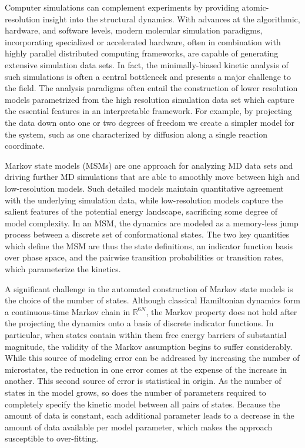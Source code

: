 \documentclass[twocolumn,floatfix,nofootinbib,aps]{revtex4-1}
\begin{document}
Computer simulations can complement experiments by providing atomic-resolution insight into the structural dynamics. With advances at the algorithmic, hardware, and software levels, modern molecular simulation paradigms, incorporating specialized or accelerated hardware, often in combination with highly parallel distributed computing frameworks, are capable of generating extensive simulation data sets\cite{Eastman2013OpenMM, Shirts2000Screen, Shaw2009Millisecond, Hess2008PLINCS}. In fact, the minimally-biased kinetic analysis of such simulations is often a central bottleneck and presents a major challenge to the field. The analysis paradigms often entail the construction of lower resolution models parametrized from the high resolution simulation data set which capture the essential features in an interpretable framework\cite{Freddolino2010Challenges, Lane2013Milliseconds}. For example, by projecting the data down onto one or two degrees of freedom we create a simpler model for the system, such as one characterized by diffusion along a single reaction coordinate\cite{Best2010Coordinate}.

Markov state models (MSMs) are one approach for analyzing MD data sets and driving further MD simulations that are able to smoothly move between high and low-resolution models\cite{Pande2010Everything, Beauchamp2012Simple, Prinz2011Markov, Bowman2013Quantitative}. Such detailed models maintain quantitative agreement with the underlying simulation data, while low-resolution models capture the salient features of the potential energy landscape, sacrificing some degree of model complexity. In an MSM, the dynamics are modeled as a memory-less jump process between a discrete set of conformational states. The two key quantities which define the MSM are thus the state definitions, an indicator function basis over phase space, and the pairwise transition probabilities or transition rates, which parameterize the kinetics.

A significant challenge in the automated construction of Markov state models is the choice of the number of states\cite{McGibbon2013Learning}. Although classical Hamiltonian dynamics form a continuous-time Markov chain in $\mathbb{R}^{6N}$, the Markov property does not hold after the projecting the dynamics onto a basis of discrete indicator functions. In particular, when states contain within them free energy barriers of substantial magnitude, the validity of the Markov assumption begins to suffer considerably. While this source of modeling error can be addressed by increasing the number of microstates, the reduction in one error comes at the expense of the increase in another. This second source of error is statistical in origin. As the number of states in the model grows, so does the number of parameters required to completely specify the kinetic model between all pairs of states. Because the amount of data is constant, each additional parameter leads to a decrease in the amount of data available per model parameter, which makes the approach susceptible to over-fitting.
\end{document}
